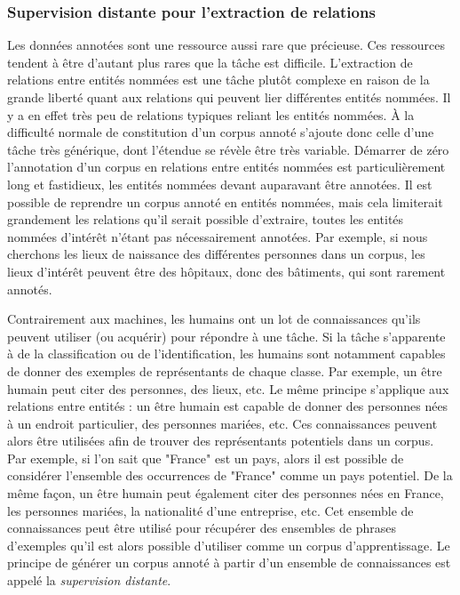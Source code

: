 \documentclass[12pt,a4paper,times,twoside,openright]{report}
\begin{document}
        \subsubsection{Supervision distante pour l'extraction de relations}
        \label{subsec:multir-distant-supervision}
Les données annotées sont une ressource aussi rare que précieuse. Ces ressources tendent à être d'autant plus rares que la tâche est difficile. L'extraction de relations entre entités nommées est une tâche plutôt complexe en raison de la grande liberté quant aux relations qui peuvent lier différentes entités nommées. Il y a en effet très peu de relations typiques reliant les entités nommées. À la difficulté normale de constitution d'un corpus annoté s'ajoute donc celle d'une tâche très générique, dont l'étendue se révèle être très variable. Démarrer de zéro l'annotation d'un corpus en relations entre entités nommées est particulièrement long et fastidieux, les entités nommées devant auparavant être annotées. Il est possible de reprendre un corpus annoté en entités nommées, mais cela limiterait grandement les relations qu'il serait possible d'extraire, toutes les entités nommées d'intérêt n'étant pas nécessairement annotées. Par exemple, si nous cherchons les lieux de naissance des différentes personnes dans un corpus, les lieux d'intérêt peuvent être des hôpitaux, donc des bâtiments, qui sont rarement annotés.

Contrairement aux machines, les humains ont un lot de connaissances qu'ils peuvent utiliser (ou acquérir) pour répondre à une tâche. Si la tâche s'apparente à de la classification ou de l'identification, les humains sont notamment capables de donner des exemples de représentants de chaque classe. Par exemple, un être humain peut citer des personnes, des lieux, etc. Le même principe s'applique aux relations entre entités : un être humain est capable de donner des personnes nées à un endroit particulier, des personnes mariées, etc. Ces connaissances peuvent alors être utilisées afin de trouver des représentants potentiels dans un corpus. Par exemple, si l'on sait que "France" est un pays, alors il est possible de considérer l'ensemble des occurrences de "France" comme un pays potentiel. De la même façon, un être humain peut également citer des personnes nées en France, les personnes mariées, la nationalité d'une entreprise, etc. Cet ensemble de connaissances peut être utilisé pour récupérer des ensembles de phrases d'exemples qu'il est alors possible d'utiliser comme un corpus d'apprentissage. Le principe de générer un corpus annoté à partir d'un ensemble de connaissances est appelé la \emph{supervision distante}.
\end{document}
